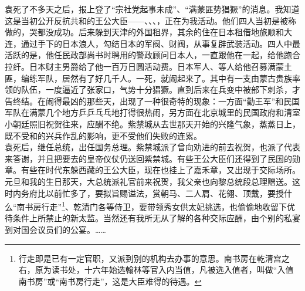 袁死了不多天之后，报上登了“宗社党起事未成”、“满蒙匪势猖獗”的消息。我知道这是当初公开反抗共和的王公大臣——、、、，正在为我活动。他们四人当初是被称做的，哭都没成功。后来躲到天津的外国租界，其余的住在日本租借地旅顺和大连，通过手下的日本浪人，勾结日本的军阀、财阀，从事复辟武装活动。四人中最活跃的是，他任民政部尚书时聘用的警政顾问日本人，一直跟他在一起，给他跑合拉纤。日本财主男爵给了他一百万日圆活动费。日本军人、等人给他召募满蒙土匪，编练军队，居然有了好几千人。一死，就闹起来了。其中有一支由蒙古贵族率领的队伍，一度逼近了张家口，气势十分猖獗。直到后来在兵变中被部下刺杀，才告终结。在闹得最凶的那些天，出现了一种很奇特的现象：一方面“勤王军”和民国军队在满蒙几个地方乒乒乓乓地打得很热闹，另方面在北京城里的民国政府和清室小朝廷照旧祝贺往来，应酬不绝。紫禁城从去世那天开始的兴隆气象，蒸蒸日上，既不受和的兴兵作乱的影响，更不受他们失败的连累。\\

袁死后，继任总统，出任国务总理。紫禁城派了曾向劝进的前去祝贺，也派了代表来答谢，并且把要去的皇帝仪仗仍送回紫禁城。有些王公大臣们还得到了民国的勋章。有些在时代东躲西藏的王公大臣，现在也挂上了嘉禾章，又出现于交际场所。元旦和我的生日那天，大总统派礼官前来祝贺，我父亲也向黎总统段总理赠送。这时内务府比以前忙多了，要拟旨赐谥法，赏朝马、二人肩、花翎、顶戴，要授什么“南书房行走”\footnote{行走即是已有一定官职，又派到别的机构去办事的意思。南书房在乾清宫之右，原为读书处，十六年始选翰林等官入内当值，凡被选入值者，叫做“入值南书房”或“南书房行走”，这是大臣难得的待遇。}、乾清门各等侍卫，要带领秀女供太妃挑选，也偷偷地收留下优待条件上所禁止的新太监。当然还有我所无从了解的各种交际应酬，由个别的私宴到对国会议员们的公宴。……\\

